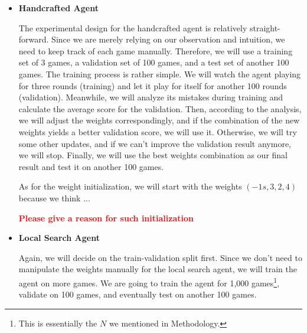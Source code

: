 \documentclass[letterpaper]{article} %
\begin{document}
\begin{itemize}
  \item \textbf{Handcrafted Agent} 
  
  The experimental design for the handcrafted agent is relatively straight-forward. Since we are merely relying on our observation and intuition, we need to keep track of each game manually. Therefore, we will use a training set of 3 games, a validation set of 100 games, and a test set of another 100 games. The training process is rather simple. We will watch the agent playing for three rounds (training) and let it play for itself for another 100 rounds (validation). Meanwhile, we will analyze its mistakes during training and calculate the average score for the validation. Then, according to the analysis, we will adjust the weights correspondingly, and if the combination of the new weights yields a better validation score, we will use it. Otherwise, we will try some other updates, and if we can't improve the validation result anymore, we will stop. Finally, we will use the best weights combination as our final result and test it on another 100 games.

  As for the weight initialization, we will start with the weights $(-1s,3,2,4)$ because we think ... 
  
  \textcolor{red}{\textbf{Please give a reason for such initialization} }

  \item \textbf{Local Search Agent} 
  
  Again, we will decide on the train-validation split first. Since we don't need to manipulate the weights manually for the local search agent, we will train the agent on more games. We are going to train the agent for 1,000 games\footnote{This is essentially the $N$ we mentioned in Methodology.}, validate on 100 games, and eventually test on another 100 games. 


\end{itemize}
\end{document}
